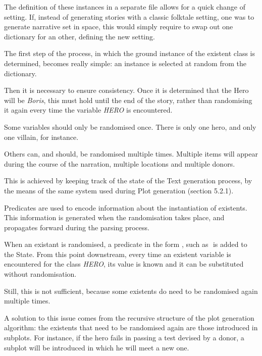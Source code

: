 \documentclass[12pt,a4paper,oneside]{report}
\begin{document}
\bigskip

The definition of these instances in a separate file allows for a quick change of setting. If, instead of generating stories with a classic folktale setting, one was to generate narrative set in space, this would simply require to swap out one dictionary for an other, defining the new setting.

\bigskip

The first step of the process, in which the ground instance of the existent class is determined, becomes really simple: an instance is selected at random from the dictionary.

\bigskip

Then it is necessary to ensure consistency. Once it is determined that the Hero will be \textit{Boris}, this must hold until the end of the story, rather than randomising it again every time the variable \textit{HERO} is encountered.

Some variables should only be randomised once. There is only one hero, and only one villain, for instance.

Others can, and should, be randomised multiple times. Multiple items will appear during the course of the narration, multiple locations and multiple donors.

\bigskip

This is achieved by keeping track of the state of the Text generation process, by the means of the same system used during Plot generation (section 5.2.1).

Predicates are used to encode information about the instantiation of existents. This information is generated when the randomisation takes place, and propagates forward during the parsing process.

When an existant is randomised, a predicate in the form \(<Class,Instance>\), such as \(<HERO,Boris>\) is added to the State. From this point downstream, every time an existent variable is encountered for the class \textit{HERO}, its value is known and it can be substituted without randomisation.

\bigskip

Still, this is not sufficient, because some existents do need to be randomised again multiple times.

\bigskip

A solution to this issue comes from the recursive structure of the plot generation algorithm: the existents that need to be randomised again are those introduced in subplots. For instance, if the hero fails in passing a test devised by a donor, a subplot will be introduced in which he will meet a new one.
\end{document}
